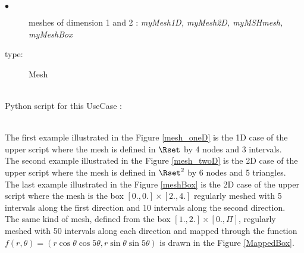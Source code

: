 {
  \begin{description}
  \item[$\bullet$]  meshes of dimension 1 and 2 : {\itshape myMesh1D, myMesh2D, myMSHmesh, myMeshBox}
  \item[type:]  Mesh
  \end{description}
}

\textspace\\
Python script for this UseCase :



\textspace\\
The first example illustrated in the Figure \ref{mesh_oneD} is the 1D case of the upper script where the mesh is defined in $\Rset$ by 4 nodes and 3 intervals.\\
The second example illustrated in the Figure \ref{mesh_twoD} is the 2D case of the upper script where the mesh is defined in $\Rset^2$ by 6 nodes and 5 triangles.\\
The last example illustrated in the Figure \ref{meshBox} is the 2D case of the upper script where the mesh is the box $[0., 0.] \times [2., 4.]$ regularly meshed with 5 intervals along the first direction and 10 intervals along the second direction.\\
The same kind of mesh, defined from the box $[1., 2.] \times [0., \Pi]$, regularly meshed with 50 intervals along each direction and mapped through the function $f(r,  \theta)=(r\cos \theta \cos 5\theta, r\sin \theta \sin 5\theta)$ is drawn in the Figure \ref{MappedBox}.\\

